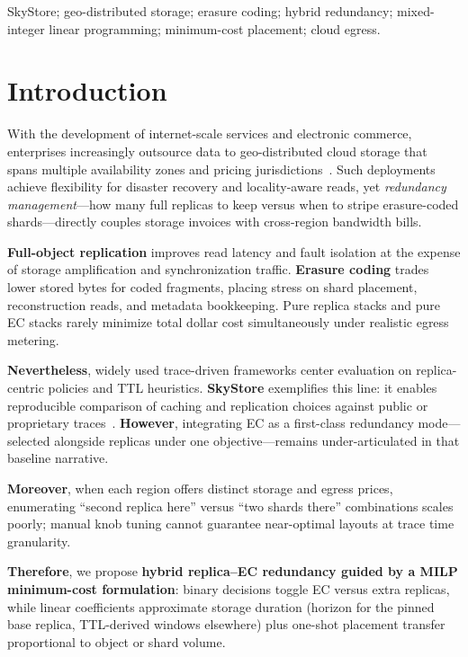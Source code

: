 \documentclass[conference]{IEEEtran}
\begin{document}
\begin{IEEEkeywords}
SkyStore; geo-distributed storage; erasure coding; hybrid redundancy; mixed-integer linear programming; minimum-cost placement; cloud egress.
\end{IEEEkeywords}

\section{Introduction}
\label{sec:intro}

With the development of internet-scale services and electronic commerce, enterprises increasingly outsource data to geo-distributed cloud storage that spans multiple availability zones and pricing jurisdictions~\cite{skystore}.
Such deployments achieve flexibility for disaster recovery and locality-aware reads, yet \emph{redundancy management}---how many full replicas to keep versus when to stripe erasure-coded shards---directly couples storage invoices with cross-region bandwidth bills.

\textbf{Full-object replication} improves read latency and fault isolation at the expense of storage amplification and synchronization traffic.
\textbf{Erasure coding} trades lower stored bytes for coded fragments, placing stress on shard placement, reconstruction reads, and metadata bookkeeping.
Pure replica stacks and pure EC stacks rarely minimize total dollar cost simultaneously under realistic egress metering.

\textbf{Nevertheless}, widely used trace-driven frameworks center evaluation on replica-centric policies and TTL heuristics.
\textbf{SkyStore} exemplifies this line: it enables reproducible comparison of caching and replication choices against public or proprietary traces~\cite{skystore}.
\textbf{However}, integrating EC as a first-class redundancy mode---selected alongside replicas under one objective---remains under-articulated in that baseline narrative.

\textbf{Moreover}, when each region offers distinct storage and egress prices, enumerating ``second replica here'' versus ``two shards there'' combinations scales poorly; manual knob tuning cannot guarantee near-optimal layouts at trace time granularity.

\textbf{Therefore}, we propose \textbf{hybrid replica--EC redundancy guided by a MILP minimum-cost formulation}: binary decisions toggle EC versus extra replicas, while linear coefficients approximate storage duration (horizon for the pinned base replica, TTL-derived windows elsewhere) plus one-shot placement transfer proportional to object or shard volume.
\end{document}
